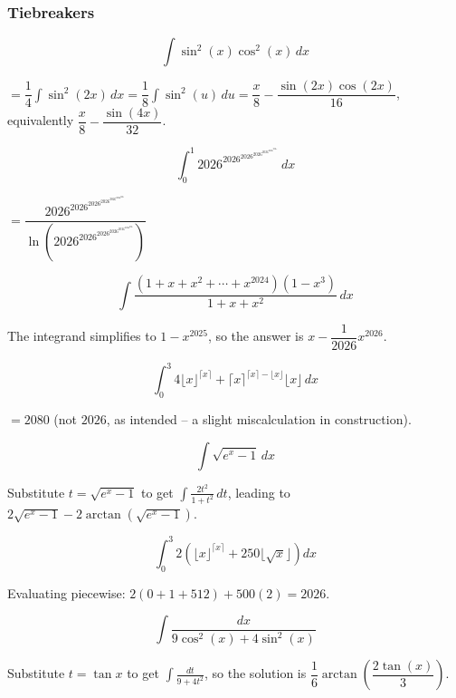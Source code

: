 \subsubsection*{Tiebreakers}
\begin{questions}

\question \[ \int \sin^2(x)\cos^2(x)\, dx \]
\begin{solution}
$= \dfrac{1}{4}\displaystyle\int \sin^2(2x)\, dx = \dfrac{1}{8}\int \sin^2(u)\, du = \dfrac{x}{8}-\dfrac{\sin(2x)\cos(2x)}{16}$, equivalently $\dfrac{x}{8}-\dfrac{\sin(4x)}{32}$.
\end{solution}

\question \[ \int_0^1 2026^{2026^{2026^{2026^{2026^{2026^{2026x}}}}}}\, dx \]
\begin{solution}
$= \dfrac{2026^{2026^{2026^{2026^{2026^{2026^{2026}}}}}}}{\ln\left(2026^{2026^{2026^{2026^{2026^{2026^{2026}}}}}}\right)}$
\end{solution}

\question \[ \int \frac{(1+x+x^2+\cdots+x^{2024})(1-x^3)}{1+x+x^2}\, dx \]
\begin{solution}
The integrand simplifies to $1-x^{2025}$, so the answer is $x-\dfrac{1}{2026}x^{2026}$.
\end{solution}

\question \[ \int_0^3 4\lfloor x\rfloor^{\lceil x\rceil}+\lceil x\rceil^{\lceil x\rceil - \lfloor x\rfloor}\lfloor x\rfloor\, dx \]
\begin{solution}
$= 2080$ (not $2026$, as intended -- a slight miscalculation in construction).
\end{solution}

\question \[ \int \sqrt{e^x-1}\, dx \]
\begin{solution}
Substitute $t=\sqrt{e^x-1}$ to get $\displaystyle\int \frac{2t^2}{1+t^2}\, dt$, leading to $2\sqrt{e^x-1}-2\arctan\left(\sqrt{e^x-1}\right)$.
\end{solution}

\question \[ \int_0^3 2\left(\lfloor x\rfloor^{\lceil x\rceil}+250\lfloor \sqrt{x}\rfloor\right) dx \]
\begin{solution}
Evaluating piecewise: $2(0+1+512)+500(2) = 2026$.
\end{solution}

\question \[ \int \frac{dx}{9\cos^2(x)+4\sin^2(x)} \]
\begin{solution}
Substitute $t=\tan x$ to get $\displaystyle\int \frac{dt}{9+4t^2}$, so the solution is $\dfrac{1}{6}\arctan\left(\dfrac{2\tan(x)}{3}\right)$.
\end{solution}


\end{questions}
